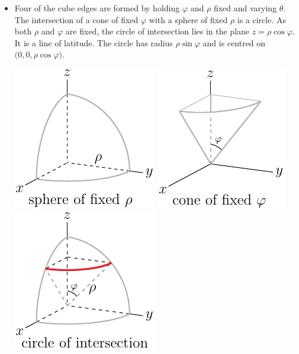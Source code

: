 \begin{itemize}
\item 
Four of the cube edges are formed by holding $\varphi$ and $\rho$
fixed and varying $\theta$. The intersection of a cone of fixed $\varphi$
with a sphere of fixed $\rho$ is a circle. As both $\rho$ and $\varphi$
are fixed, the circle of intersection lies in the plane $z=\rho\cos\varphi$. 
It is a line of latitude.
The circle has radius $\rho\sin\varphi$ and is centred
on $\big(0,0, \rho\cos\varphi\big)$.  
\begin{efig}
\begin{center}
     \includegraphics{sphereRho.pdf}\quad
     \includegraphics{spherePhi.pdf}\quad
     \includegraphics{sphereRhoPhi.pdf}

\end{center}
\end{efig}
\end{itemize}
